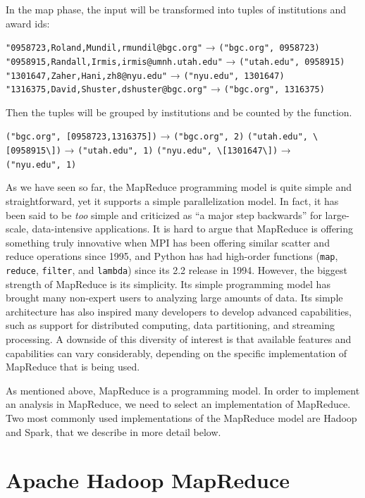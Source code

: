 \documentclass[]{krantz}
\begin{document}
In the map phase, the input will be transformed into tuples of
institutions and award ids:

\texttt{"0958723,Roland,Mundil,rmundil@bgc.org"} →
\texttt{("bgc.org",\ 0958723)}
\texttt{"0958915,Randall,Irmis,irmis@umnh.utah.edu"} →
\texttt{("utah.edu",\ 0958915)}
\texttt{"1301647,Zaher,Hani,zh8@nyu.edu"} →
\texttt{("nyu.edu",\ 1301647)}
\texttt{"1316375,David,Shuster,dshuster@bgc.org"} →
\texttt{("bgc.org",\ 1316375)}

Then the tuples will be grouped by institutions and be counted by the
function.

\texttt{("bgc.org",\ {[}0958723,1316375{]})} → \texttt{("bgc.org",\ 2)}
\texttt{("utah.edu",\ \textbackslash{}{[}0958915\textbackslash{}{]})} →
\texttt{("utah.edu",\ 1)}
\texttt{("nyu.edu",\ \textbackslash{}{[}1301647\textbackslash{}{]})} →
\texttt{("nyu.edu",\ 1)}

As we have seen so far, the MapReduce programming model is quite simple
and straightforward, yet it supports a simple parallelization model. In
fact, it has been said to be \emph{too} simple and criticized as ``a
major step backwards'' \citep{MapReduceBad} for large-scale,
data-intensive applications. It is hard to argue that MapReduce is
offering something truly innovative when MPI has been offering similar
scatter and reduce operations since 1995, and Python has had high-order
functions (\texttt{map}, \texttt{reduce}, \texttt{filter}, and
\texttt{lambda}) since its 2.2 release in 1994. However, the biggest
strength of MapReduce is its simplicity. Its simple programming model
has brought many non-expert users to analyzing large amounts of data.
Its simple architecture has also inspired many developers to develop
advanced capabilities, such as support for distributed computing, data
partitioning, and streaming processing. A downside of this diversity of
interest is that available features and capabilities can vary
considerably, depending on the specific implementation of MapReduce that
is being used.

As mentioned above, MapReduce is a programming model. In order to
implement an analysis in MapReduce, we need to select an implementation
of MapReduce. Two most commonly used implementations of the MapReduce
model are Hadoop and Spark, that we describe in more detail below.

\section{Apache Hadoop MapReduce}\label{apache-hadoop-mapreduce}
\end{document}
